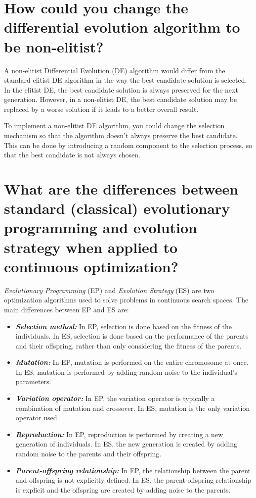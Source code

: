 \documentclass[conference]{IEEEtran}
\begin{document}
\section{How could you change the differential evolution algorithm to be non-elitist?}

A non-elitist Differential Evolution (DE) algorithm would differ from the standard elitist DE algorithm in the way the best candidate solution is selected. In the elitist DE, the best candidate solution is always preserved for the next generation. However, in a non-elitist DE, the best candidate solution may be replaced by a worse solution if it leads to a better overall result.

To implement a non-elitist DE algorithm, you could change the selection mechanism so that the algorithm doesn't always preserve the best candidate. This can be done by introducing a random component to the selection process, so that the best candidate is not always chosen.


\section{What are the differences between standard (classical) evolutionary programming and evolution strategy when applied to continuous optimization?}

\textit{Evolutionary Programming }(EP) and \textit{Evolution Strategy} (ES) are two optimization algorithms used to solve problems in continuous search spaces. The main differences between EP and ES are:

\begin{itemize}
	\item \textbf{\textit{Selection method:}} In EP, selection is done based on the fitness of the individuals. In ES, selection is done based on the performance of the parents and their offspring, rather than only considering the fitness of the parents.
	
	\item \textbf{\textit{Mutation:}} In EP, mutation is performed on the entire chromosome at once. In ES, mutation is performed by adding random noise to the individual's parameters.
	
	\item \textbf{\textit{Variation operator:}} In EP, the variation operator is typically a combination of mutation and crossover. In ES, mutation is the only variation operator used.
	
	\item \textbf{\textit{Reproduction:}} In EP, reproduction is performed by creating a new generation of individuals. In ES, the new generation is created by adding random noise to the parents and their offspring.
	
	\item \textbf{\textit{Parent-offspring relationship:}} In EP, the relationship between the parent and offspring is not explicitly defined. In ES, the parent-offspring relationship is explicit and the offspring are created by adding noise to the parents.
\end{itemize}
\end{document}
